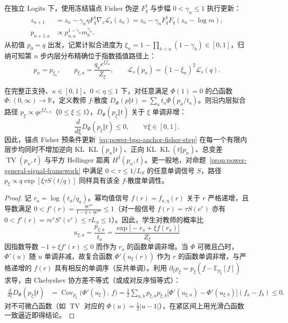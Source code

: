 \documentclass[lang=cn,scheme=chinese,openany]{elegantbook}
\newcommand{\E}{\mathbb E}
\newcommand{\KL}{\operatorname{KL}}
\newcommand{\TV}{\operatorname{TV}}
\newcommand{\R}{\mathbb R}
\begin{document}
在独立 Logits 下，使用冻结锚点 Fisher 伪逆 $F_q^\dagger$ 与步幅 $0<\gamma_n\le 1$ 执行更新：
\begin{align}
 z_{n+1}&=z_n-\gamma_n\eta F_q^\dagger\nabla_z\mathcal L_s(z_n)
     =z_n-\gamma_n F_q^\dagger F_q(z_n-\log m),\\
 p_{n+1,a}&\propto p_{n,a}^{1-\gamma_n}m_a^{\gamma_n}.
 \label{eq:power-bpo-anchor-fisher-step}
\end{align}
从初值 $p_0=q$ 出发，记累计拟合进度为 $\xi_n=1-\prod_{h<n}(1-\gamma_h)\in[0,1]$，归纳可知第 $n$ 步内层分布精确位于指数插值路径上：
\begin{equation}
 p_n=p_{\xi_n},\qquad
 p_{\xi,a}=\frac{q_a e^{\xi f_a}}{Z_\xi},\qquad
 \mathcal L_s(p_n)=(1-\xi_n)^2\mathcal L_s(q).
 \label{eq:power-bpo-finite-inner-path}
\end{equation}

\begin{theorem}
\label{thm:power-bpo-inner-all-f}
\label{cor:power-general-signal-all-f}
在完整正支持、$\kappa\in[0,1]$、$0<\eta\le 1$ 下，对任意满足 $\Phi(1)=0$ 的凸函数 $\Phi:(0,\infty)\to\R$，定义教师 $f$-散度 $D_\Phi(p\Vert t)=\sum_a t_a\Phi(p_a/t_a)$。则沿内层拟合路径 $p_\xi\propto q e^{\xi f_{\kappa,\eta}}$（$0\le\xi\le 1$），$D_\Phi(p_\xi\Vert t)$ 关于 $\xi$ 单调非增：
\begin{equation*}
 \frac{d}{d\xi}D_\Phi(p_\xi\Vert t)\le 0,\qquad \forall\xi\in[0,1].
\end{equation*}
因此，锚点 Fisher 预条件更新~\eqref{eq:power-bpo-anchor-fisher-step} 在每一个有限内层步均同时不增加逆向 KL $\KL(p_n\Vert t)$、正向 KL $\KL(t\Vert p_n)$、总变差 $\TV(p_n,t)$ 与平方 Hellinger 距离 $H^2(p_n,t)$。更一般地，对命题~\ref{prop:power-general-signal-framework} 中满足 $0<\tau\le 1/L_S$ 的任意单调信号 $S$，路径 $p_\xi\propto q\exp[\xi\tau S(t/q)]$ 同样具有该全 $f$-散度单调性。
\end{theorem}
\begin{proof}
记 $r_a=\log(t_a/q_a)$。幂均值信号 $f(r)=f_{\kappa,\eta}(r)$ 关于 $r$ 严格递增，且导数满足 $0<f'(r)=\frac{\eta e^{\kappa r}}{1-\eta+\eta e^{\kappa r}}\le 1$（对一般信号 $f(r)=\tau S(e^r)$ 亦有 $0<f'(r)=\tau e^r S'(e^r)\le\tau L_S\le 1$）。因此，学生对教师的概率比
\begin{equation}
 u_{\xi,a}=\frac{p_{\xi,a}}{t_a}
 =\frac{\exp\bigl[-r_a+\xi f(r_a)\bigr]}{Z_\xi}
\end{equation}
因指数导数 $-1+\xi f'(r)\le 0$ 而作为 $r_a$ 的函数单调非增。当 $\Phi$ 可微且凸时，$\Phi'(u)$ 随 $u$ 单调非减，故复合函数 $\Phi'(u_\xi(r))$ 作为 $r$ 的函数单调非增，与严格递增的 $f(r)$ 具有相反的单调序（反共单调）。利用 $\partial_\xi p_\xi=p_\xi(f-\E_{p_\xi}[f])$ 求导，由 Chebyshev 协方差不等式（或成对反序恒等式）：
\begin{align}
 \frac{d}{d\xi}D_\Phi(p_\xi\Vert t)
 &=\operatorname{Cov}_{p_\xi}\bigl(\Phi'(u_\xi),\,f\bigr)
 =\frac12\sum_{a,b}p_{\xi,a}p_{\xi,b}
   \bigl[\Phi'(u_{\xi,a})-\Phi'(u_{\xi,b})\bigr](f_a-f_b)
 \le 0.
\end{align}
对不可微凸函数（如 $\TV$ 对应的 $\Phi(u)=\frac12|u-1|$），在紧区间上用光滑凸函数一致逼近即得结论。
\end{proof}
\end{document}
